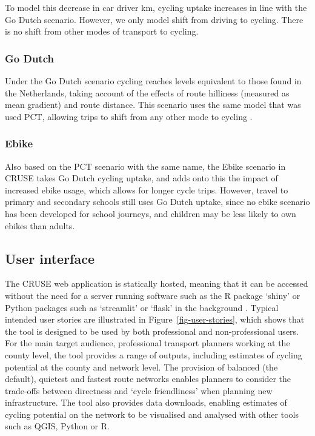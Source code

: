 \documentclass[
  super,
  preprint,
  3p]{elsarticle}
\begin{document}
To model this decrease in car driver km, cycling uptake increases in
line with the Go Dutch scenario. However, we only model shift from
driving to cycling. There is no shift from other modes of transport to
cycling.

\subsubsection{Go Dutch}\label{go-dutch}

Under the Go Dutch scenario cycling reaches levels equivalent to those
found in the Netherlands, taking account of the effects of route
hilliness (measured as mean gradient) and route distance. This scenario
uses the same model that was used PCT, allowing trips to shift from any
other mode to cycling \citep{lovelace2017}.

\subsubsection{Ebike}\label{ebike}

Also based on the PCT scenario with the same name, the Ebike scenario in
CRUSE takes Go Dutch cycling uptake, and adds onto this the impact of
increased ebike usage, which allows for longer cycle trips. However,
travel to primary and secondary schools still uses Go Dutch uptake,
since no ebike scenario has been developed for school journeys, and
children may be less likely to own ebikes than adults.

\subsection{User interface}\label{sec-ui}

The CRUSE web application is statically hosted, meaning that it can be
accessed without the need for a server running software such as the R
package `shiny' or Python packages such as `streamlit' or `flask' in the
background \citep{wickham2021}. Typical intended user stories are
illustrated in Figure~\ref{fig-user-stories}, which shows that the tool
is designed to be used by both professional and non-professional users.
For the main target audience, professional transport planners working at
the county level, the tool provides a range of outputs, including
estimates of cycling potential at the county and network level. The
provision of balanced (the default), quietest and fastest route networks
enables planners to consider the trade-offs between directness and
`cycle friendliness' when planning new infrastructure. The tool also
provides data downloads, enabling estimates of cycling potential on the
network to be visualised and analysed with other tools such as QGIS,
Python or R.
\end{document}
